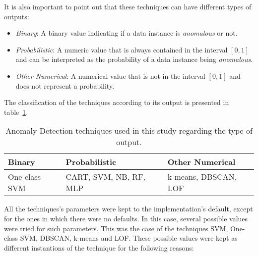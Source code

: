 It is also important to point out that these techniques can have different types of outputs:

\begin{itemize}
	\item \textit{Binary}: A binary value indicating if a data instance is \textit{anomalous} or not.
	\item \textit{Probabilistic}: A numeric value that is always contained in the interval $[0,1]$ and can be interpreted as the probability of a data instance being \textit{anomalous}.
	\item \textit{Other Numerical}: A numerical value that is not in the interval $[0,1]$ and does not represent a probability.
\end{itemize}

The classification of the techniques according to its output is presented in table~\ref{tab:anoutput}.

\begin{table}[!ht]
	\centering
	\caption{Anomaly Detection techniques used in this study regarding the type of output.}
	\label{tab:anoutput}
	\begin{tabular}{@{}l|l|l@{}}
		\toprule
		\textbf{Binary} & \textbf{Probabilistic} & \textbf{Other Numerical} \\ \midrule
		One-class SVM & CART, SVM, NB, RF, MLP & k-means, DBSCAN, LOF \\ \bottomrule
	\end{tabular}
\end{table}




All the techniques's parameters were kept to the implementation's default, except for the ones in which there were no defaults.
In this case, several possible values were tried for such parameters.
This was the case of the techniques SVM, One-class SVM, DBSCAN, k-means and LOF.
These possible values were kept as different instantions of the technique for the following reasons:


